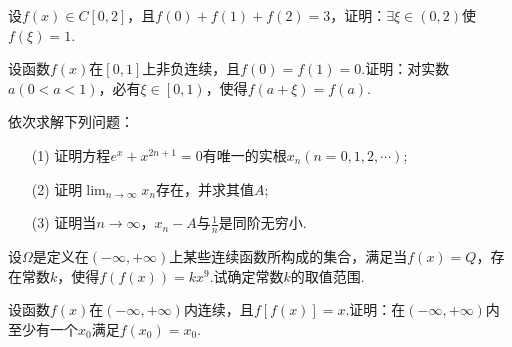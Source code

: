 \begin{xiti}
%	
\item 设$f ( x ) \in C [ 0,2 ]$，且$f ( 0 ) + f ( 1 ) + f ( 2 ) = 3$，证明：$\exists \xi \in ( 0,2 )$使$f(\xi)=1$.
\item 设函数$f(x)$在$[0,1]$上非负连续，且$f(0)=f(1)=0$.证明：对实数$a(0<a<1)$，必有$\xi \in \left[ 0,1\right) $，使得$f(a+\xi )=f(a)$.
\item 依次求解下列问题：
\begin{enumerate}
	\item [(1)] 证明方程$e ^ { x } + x ^ { 2 n + 1 } = 0$有唯一的实根$x_{n}(n=0,1,2,\cdots)$;
	\item [(2)]证明$\lim_{ n \rightarrow \infty }x_{n}$存在，并求其值$A$;
	\item [(3)]证明当$n\rightarrow \infty$，$x_{n}-A$与$\frac{1}{n}$是同阶无穷小.
\end{enumerate}
\item 设$\Omega$是定义在$(-\infty,+\infty)$上某些连续函数所构成的集合，满足当$f(x)=Q$，存在常数$k$，使得$f ( f ( x ) ) = k x ^ { 9 }$.试确定常数$k$的取值范围.
\item 设函数$f(x)$在$(-\infty,+\infty)$内连续，且$f[f(x)]=x$.证明：在$(-\infty,+\infty)$内至少有一个$x_{0}$满足$f(x_{0})=x_{0}$.

%	
%	
%

\end{xiti}

